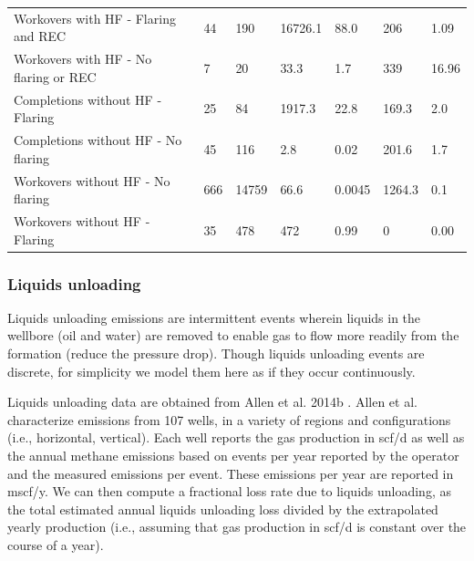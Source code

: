 \documentclass[11pt]{report}
\begin{document}
\begin{landscape}
\begin{table}
\begin{scriptsize}
\begin{tabular*}{1\columnwidth}{p{}p{}p{}p{}p{}p{}p{}}
Workovers with HF - Flaring and REC         		& 44                         & 190                       & 16726.1             & 88.0                   & 206                 & 1.09                   \\
Workovers with HF - No flaring or REC  			& 7                          & 20                        & 33.3                & 1.7                    & 339                 & 16.96   \\  
\midrule       
Completions without HF - Flaring                                & 25                         & 84                        & 1917.3              & 22.8                   & 169.3               & 2.0                    \\
Completions without HF - No flaring                            & 45                         & 116                       & 2.8                 & 0.02                   & 201.6               & 1.7                    \\
Workovers without HF - No flaring                               & 666                        & 14759                     & 66.6                & 0.0045                 & 1264.3              & 0.1                    \\
Workovers without HF - Flaring                                     & 35                         & 478                       & 472                 & 0.99                   & 0                   & 0.00                   \\
\bottomrule
\end{tabular*}
\end{scriptsize}
\end{table}
\end{landscape}



\subsubsection{Liquids unloading}

Liquids unloading emissions are intermittent events wherein liquids in the wellbore (oil and water) are removed to enable gas to flow more readily from the formation (reduce the pressure drop). Though liquids unloading events are discrete, for simplicity we model them here as if they occur continuously.

Liquids unloading data are obtained from Allen et al. 2014b \cite{Allen2014b}. Allen et al. characterize emissions from 107 wells, in a variety of regions and configurations (i.e., horizontal, vertical). Each well reports the gas production in scf/d as well as the annual methane emissions based on events per year reported by the operator and the measured emissions per event. These emissions per year are reported in mscf/y. We can then compute a fractional loss rate due to liquids unloading, as the total estimated annual liquids unloading loss divided by the extrapolated yearly production (i.e., assuming that gas production in scf/d is constant over the course of a year).
\end{document}
